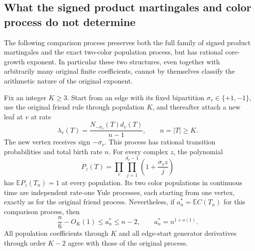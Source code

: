 \subsection{What the signed product martingales and color process do not determine}

The following comparison process preserves both the full family of signed
product martingales and the exact two-color population process, but has
rational core-growth exponent.  In particular these two structures, even
together with arbitrarily many original finite coefficients, cannot by
themselves classify the arithmetic nature of the original exponent.

\begin{proposition}\label{bpm:comparison}
Fix an integer $K\geq3$.  Start from an edge with its fixed bipartition
$\sigma_v\in\{+1,-1\}$, use the original friend rule through population
$K$, and thereafter attach a new leaf at $v$ at rate
\[
 \lambda_v(T)=\frac{N_{-\sigma_v}(T)d_v(T)}{n-1},
 \qquad n=|T|\geq K.
\]
The new vertex receives sign $-\sigma_v$.  This process has rational
transition probabilities and total birth rate $n$.  For every complex
$z$, the polynomial
\[
 P_z(T)=\prod_v\prod_{j=1}^{d_v-1}\left(1+\frac{\sigma_vz}{j}\right)
\]
has $\mathbb E P_z(T_n)=1$ at every population.  Its two color populations
in continuous time are independent rate-one Yule processes, each starting
from one vertex, exactly as for the original friend process.  Nevertheless,
if $a_n^*=\mathbb E C(T_n)$ for this comparison process, then
\[
 \frac n6-O_K(1)\leq a_n^*\leq n-2,
 \qquad a_n^*=n^{1+o(1)}.
\]
All population coefficients through $K$ and all edge-start generator
derivatives through order $K-2$ agree with those of the original process.
\end{proposition}

